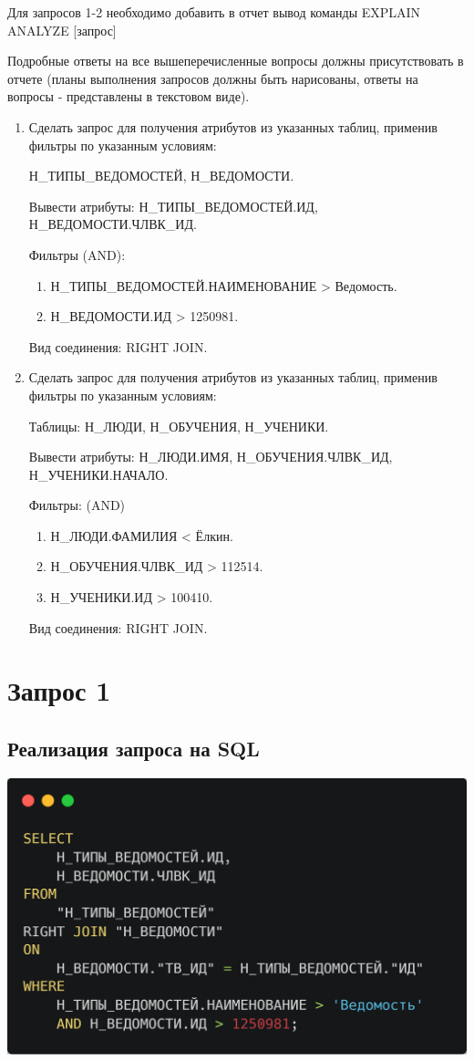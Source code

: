 \documentclass[12pt]{article}
\begin{document}
	Для запросов 1-2 необходимо добавить в отчет вывод команды EXPLAIN ANALYZE [запрос]
	
	Подробные ответы на все вышеперечисленные вопросы должны присутствовать в отчете (планы выполнения запросов должны быть нарисованы, ответы на вопросы - представлены в текстовом виде).
	
	\begin{enumerate}
		\item 	Сделать запрос для получения атрибутов из указанных таблиц, применив фильтры по указанным условиям:
			
			Н_ТИПЫ_ВЕДОМОСТЕЙ, Н_ВЕДОМОСТИ.
			
			Вывести атрибуты: Н_ТИПЫ_ВЕДОМОСТЕЙ.ИД, Н_ВЕДОМОСТИ.ЧЛВК_ИД.
			
			Фильтры (AND):
			\begin{enumerate}[]
			\item Н_ТИПЫ_ВЕДОМОСТЕЙ.НАИМЕНОВАНИЕ > Ведомость.
			\item Н_ВЕДОМОСТИ.ИД > 1250981.
			\end{enumerate}
			Вид соединения: RIGHT JOIN.
	
		\item Сделать запрос для получения атрибутов из указанных таблиц, применив фильтры по указанным условиям:
		
			Таблицы: Н_ЛЮДИ, Н_ОБУЧЕНИЯ, Н_УЧЕНИКИ.
			
			Вывести атрибуты: Н_ЛЮДИ.ИМЯ, Н_ОБУЧЕНИЯ.ЧЛВК_ИД, Н_УЧЕНИКИ.НАЧАЛО.
			
			Фильтры: (AND)
			\begin{enumerate}[]
			\item Н_ЛЮДИ.ФАМИЛИЯ < Ёлкин.
			\item Н_ОБУЧЕНИЯ.ЧЛВК_ИД > 112514.
			\item Н_УЧЕНИКИ.ИД > 100410.
			\end{enumerate}
			Вид соединения: RIGHT JOIN.
	\end{enumerate}
	\newpage
	
	\section{Запрос 1}
	\subsection{Реализация запроса на SQL}
	\includegraphics[width=0.5\linewidth]{sql1}
\end{document}
